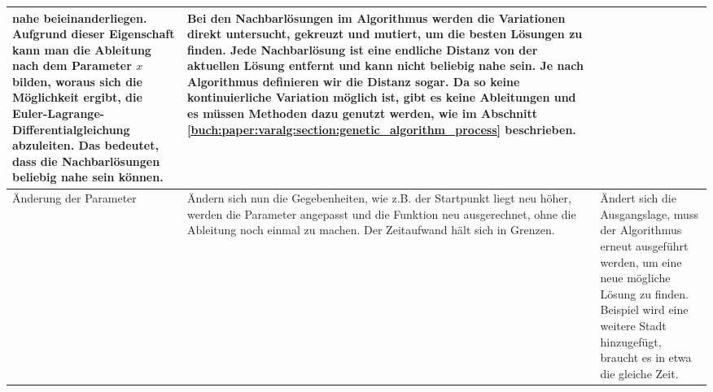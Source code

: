 \begin{xltabular}{\textwidth}{|L|X|X|}
    nahe beieinanderliegen. Aufgrund dieser Eigenschaft kann man die Ableitung nach dem
    Parameter \(x\) bilden, woraus sich die Möglichkeit ergibt, die Euler-Lagrange-Differentialgleichung
    abzuleiten. Das bedeutet, dass die Nachbarlösungen beliebig nahe sein können.  
    & 
    Bei den Nachbarlösungen im Algorithmus werden die Variationen direkt untersucht,
    gekreuzt und mutiert, um die besten Lösungen zu finden. Jede Nachbarlösung 
    ist eine endliche Distanz von der aktuellen Lösung entfernt und kann nicht beliebig 
    nahe sein. Je nach Algorithmus definieren wir die Distanz sogar.
    Da so keine kontinuierliche Variation möglich ist, gibt es keine Ableitungen
    und es müssen Methoden dazu genutzt werden, wie im Abschnitt 
    \ref{buch:paper:varalg:section:genetic_algorithm_process} beschrieben.
    \\ \hline
    Änderung der Parameter
    & 
    Ändern sich nun die Gegebenheiten, wie z.B. der Startpunkt liegt neu höher, werden die Parameter 
    angepasst und die Funktion neu ausgerechnet, ohne die Ableitung noch einmal zu machen. Der Zeitaufwand
    hält sich in Grenzen.
    & 
    Ändert sich die Ausgangslage, muss der Algorithmus erneut ausgeführt werden, um eine
    neue mögliche Lösung zu finden. Beispiel wird eine weitere Stadt hinzugefügt, braucht
    es in etwa die gleiche Zeit.
    \\ \hline
\end{xltabular}
